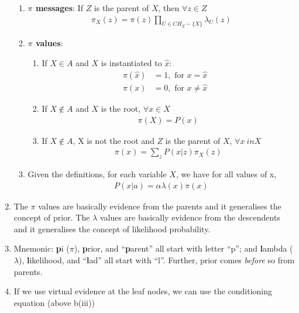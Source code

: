 \documentclass[12pt,twoside]{article}
\begin{document}
\begin{enumerate}
\begin{enumerate}
\item  \textbf{$\pi$ messages}: If $Z$ is the parent of $X$, then $\forall z \in Z$
\begin{align*}
\pi_X(z) = \pi(z) \prod_{U\in CH_Z-\lbrace X\rbrace} \lambda_U(z)
\end{align*}

\item \textbf{$\pi$ values}:
\begin{enumerate}

\item If $X\in A$ and $X$ is instantiated to $\hat{x}$:
\begin{align*}
\pi(\hat{x})& = 1,		\text{ for } x = \hat{x}&\\
\pi(x) & = 0,				\text{ for } x\neq \hat{x}&
\end{align*}

\item If $X\notin A$ and $X$ is the root, $\forall x\in X $
\begin{align*}
\pi(X) = P(x)
\end{align*}

\item If $X\notin A$, X is not the root and $Z$ is the parent of $X$, $\forall x \ in X$
\begin{align*}
\pi(x) = \sum_z P(x\vert z) \pi_X(z)
\end{align*}

\end{enumerate}
\item Given the definitions, for each variable $X$, we have for all values of x,
\begin{align*}
P(x\vert a) = \alpha \lambda(x) \pi(x)
\end{align*}

\end{enumerate}

\item The $\pi$ values are basically evidence from the parents and it generalises the concept of prior. The $\lambda$ values are basically evidence from the descendents and it generalises the concept of likelihood probability.

\item Mnemonic: \textbf{p}i (\(\pi\)), \textbf{p}rior, and ``\textbf{p}arent'' all start with letter ``p''; and \textbf{l}ambda (\(\lambda\)), \textbf{l}ikelihood, and ``\textbf{l}ad'' all start with ``l''. Further, prior comes \textit{before} so from parents.

\item If we use virtual evidence at the leaf nodes, we can use the conditioning equation (above b(iii))


\end{enumerate}
\end{document}
